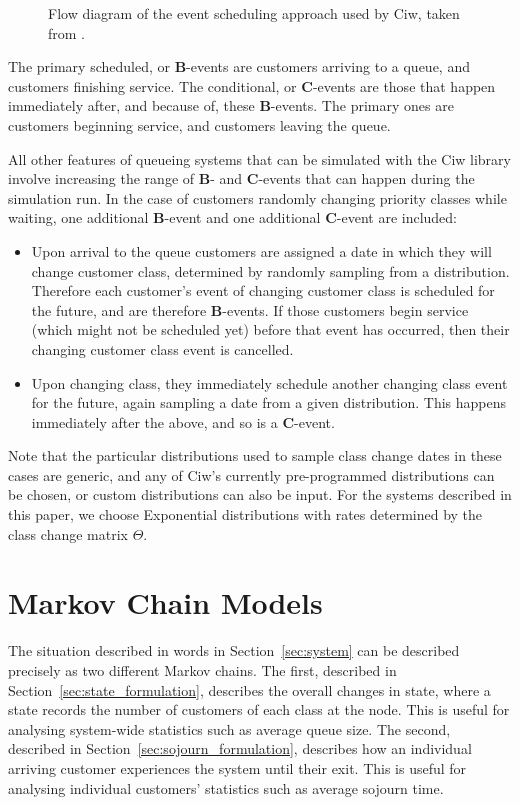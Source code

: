 \documentclass{article}
\begin{document}
\begin{figure}
    \centering
    
    \caption{Flow diagram of the event scheduling approach used by Ciw, taken from \cite{palmer18}.}
    \label{fig:eventscheduling}
\end{figure}

The primary scheduled, or \textbf{B}-events are customers arriving to a queue,
and customers finishing service. The conditional, or \textbf{C}-events are those
that happen immediately after, and because of, these \textbf{B}-events. The
primary ones are customers beginning service, and customers leaving the queue.

All other features of queueing systems that can be simulated with the Ciw
library involve increasing the range of \textbf{B}- and \textbf{C}-events that
can happen during the simulation run.
In the case of customers randomly changing priority classes while waiting, one
additional \textbf{B}-event and one additional \textbf{C}-event are included:

\begin{itemize}
  \item Upon arrival to the queue customers are assigned a date in which they
  will change customer class, determined by randomly sampling from a
  distribution. Therefore each customer's event of changing customer class is
  scheduled for the future, and are therefore \textbf{B}-events. If those
  customers begin service (which might not be scheduled yet) before that event
  has occurred, then their changing customer class event is cancelled.
  \item Upon changing class, they immediately schedule another changing class
  event for the future, again sampling a date from a given distribution. This
  happens immediately after the above, and so is a \textbf{C}-event.
\end{itemize}

Note that the particular distributions used to sample class change dates in
these cases are generic, and any of Ciw's currently pre-programmed distributions
can be chosen, or custom distributions can also be input. For the systems
described in this paper, we choose Exponential distributions with rates
determined by the class change matrix $\Theta$.




\section{Markov Chain Models}\label{sec:makovchains}
The situation described in words in Section~\ref{sec:system} can be described
precisely as two different Markov chains.
The first, described in Section~\ref{sec:state_formulation}, describes the
overall changes in state, where a state records the number of customers of each
class at the node. This is useful for analysing system-wide statistics such as
average queue size.
The second, described in Section~\ref{sec:sojourn_formulation}, describes how an
individual arriving customer experiences the system until their exit. This is
useful for analysing individual customers' statistics such as average sojourn
time.
\end{document}

